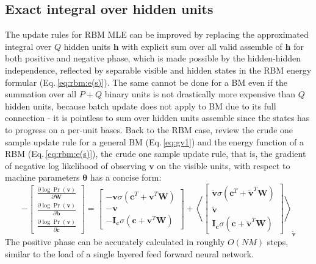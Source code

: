 \documentclass[11pt]{article}
\newcommand{\bs}{\boldsymbol}
\newcommand{\mean}[2]{\left\langle{#1}\right\rangle_{#2}}
\newcommand{\vb}{\boldsymbol{b}}
\newcommand{\vc}{\boldsymbol{c}}
\newcommand{\vh}{\boldsymbol{h}}
\newcommand{\vv}{\boldsymbol{v}}
\newcommand{\vw}{\boldsymbol{w}}
\newcommand{\mw}{\boldsymbol{W}}
\newcommand{\vvt}{\tilde{\vv}}
\newcommand{\pEC}{\boldsymbol{\theta}}
\newcommand{\PDV}[2]{\frac{\partial #1}{\partial #2}}
\begin{document}
{\subsection{Exact integral over hidden units}
The update rules for RBM MLE can be improved by replacing the approximated integral over $Q$ hidden units $\vh$ with explicit sum over all valid assemble of $\vh$ for both positive and negative phase, which is made possible by the hidden-hidden independence, reflected by separable visible and hidden states in the RBM energy formular (Eq.\,\ref{eq:rbm:e(s)}). The same cannot be done for a BM even if the summation over all $P+Q$ binary units is not drastically more expensive than $Q$ hidden units, because batch update does not apply to BM due to its full connection - it is pointless to sum over hidden units assemble since the states has to progress on a per-unit bases.
Back to the RBM case, review the crude one sample update rule for a general BM (Eq.\,\ref{eq:gv1}) and the energy function of a RBM (Eq.\,\ref{eq:rbm:e(s)}), the crude one sample update rule, that is, the gradient of negative log likelihood of observing $\vv$ on the visible units, with respect to machine parameters $\pEC$ has a concise form:
\begin{equation} \label{eq:rbm:gv1}
  -\begin{bmatrix}
    \PDV{\log{\Pr(\vv)}}{\mw} \\
    \PDV{\log{\Pr(\vv)}}{\vb} \\
    \PDV{\log{\Pr(\vv)}}{\vc}
  \end{bmatrix} = 
  \begin{bmatrix}
    -\vv\sigma(\vc^T + \vv^T\mw)      \\
    -\vv                              \\
    -\bs{I}_{\vc} \sigma(\vc + \vv^T\mw)
  \end{bmatrix} +
  \mean{\begin{bmatrix}
    \vvt\sigma(\vc^T + \vvt^T\mw)     \\
    \vvt                              \\
    \bs{I}_{\vc} \sigma(\vc + \vvt^T\mw)
  \end{bmatrix}}{\vvt}
\end{equation}
The positive phase can be accurately calculated in roughly $O(NM)$ steps, similar to the load of a single layered feed forward neural network. \\
}
\end{document}
